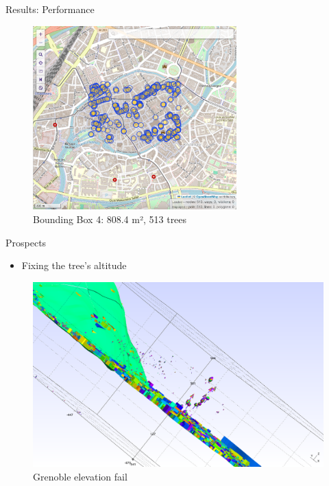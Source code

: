 \documentclass[10pt]{beamer}
\begin{document}
  \begin{frame}{Results: Performance}
	\Large
	\begin{figure}[H]
	  \centering
	  \includegraphics[width=0.7\textwidth]{images/ovt-bbox4.png}
	  \caption{Bounding Box 4: 808.4 m², 513 trees}
  \end{figure}
  \end{frame}


\begin{frame}{Prospects}
	\begin{itemize}
		\item Fixing the tree's altitude
	\end{itemize}

	\begin{figure}
		\centering
		\includegraphics[width=\textwidth]{images/grenoble_fail.png}
		\caption{Grenoble elevation fail}
		\label{fig:figure1}
	\end{figure}
\end{frame}
\end{document}

